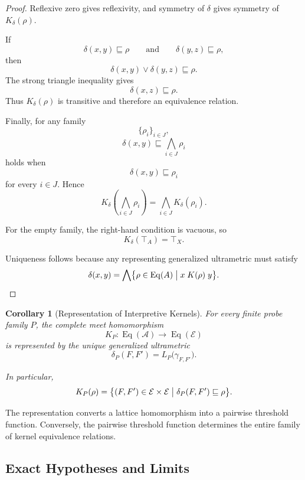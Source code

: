 \documentclass[11pt]{article}
\theoremstyle{plain}
\newtheorem{corollary}[theorem]{Corollary}
\theoremstyle{definition}
\theoremstyle{remark}
\begin{document}
\begin{proof}
  Reflexive zero gives reflexivity,
  and symmetry of \(\delta\)
  gives symmetry of \(K_{\delta}(\rho)\).

  If
  \[
    \delta(x,y)
    \sqsubseteq
    \rho
    \qquad\text{and}\qquad
    \delta(y,z)
    \sqsubseteq
    \rho,
  \]
  then
  \[
    \delta(x,y)
    \vee
    \delta(y,z)
    \sqsubseteq
    \rho.
  \]
  The strong triangle inequality gives
  \[
    \delta(x,z)
    \sqsubseteq
    \rho.
  \]
  Thus \(K_{\delta}(\rho)\)
  is transitive
  and therefore an equivalence relation.

  Finally, for any family
  \[
    \{
    \rho_i
    \}_{i\in J},
  \]
  \[
    \delta(x,y)
    \sqsubseteq
    \bigwedge_{i\in J}\rho_i
  \]
  holds when
  \[
    \delta(x,y)
    \sqsubseteq
    \rho_i
  \]
  for every \(i\in J\).
  Hence
  \[
    K_{\delta}
    \left(
    \bigwedge_{i\in J}\rho_i
    \right)
    =
    \bigwedge_{i\in J}
    K_{\delta}(\rho_i).
  \]

  For the empty family,
  the right-hand condition is vacuous,
  so
  \[
    K_{\delta}(\top_A)
    =
    \top_X.
  \]

  Uniqueness follows because any representing
  generalized ultrametric must satisfy
  \[
    \delta(x,y)
    =
    \bigwedge
    \bigl\{
    \rho
    \in
    \operatorname{Eq}(A)
    \bigm|
    x\mathrel{K(\rho)}y
    \bigr\}.
  \]
\end{proof}

\begin{corollary}[Representation of Interpretive Kernels]
  \label{ik.cor.interpretive-representation}
  For every finite probe family \(P\),
  the complete meet homomorphism
  \[
    K_P:
    \operatorname{Eq}(\mathcal{A})
    \longrightarrow
    \operatorname{Eq}(\mathcal{E})
  \]
  is represented by the unique generalized ultrametric
  \[
    \delta_P(F,F')
    =
    L_P
    \bigl(
    \gamma_{F,F'}
    \bigr).
  \]

  In particular,
  \[
    K_P(\rho)
    =
    \bigl\{
    (F,F')
    \in
    \mathcal{E}\times\mathcal{E}
    \bigm|
    \delta_P(F,F')
    \sqsubseteq
    \rho
    \bigr\}.
  \]
\end{corollary}

The representation converts a lattice homomorphism
into a pairwise threshold function.
Conversely,
the pairwise threshold function determines
the entire family of kernel equivalence relations.

\subsection{Exact Hypotheses and Limits}
\end{document}
